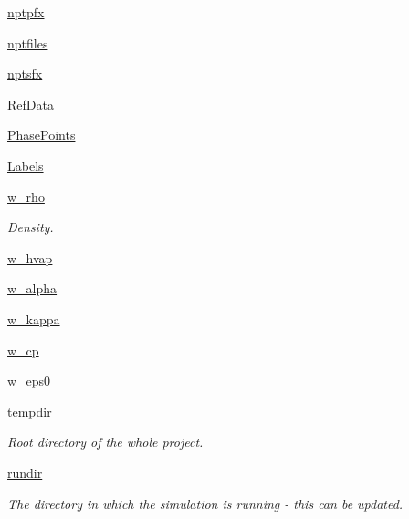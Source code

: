 \begin{DoxyCompactItemize}
\hyperlink{classforcebalance_1_1liquid_1_1Liquid_a0560795c55fc1b5d7668951c77ad97ab}{nptpfx}
\item 
\hyperlink{classforcebalance_1_1liquid_1_1Liquid_a2030a7e21fcce59155a0258daed4f2f7}{nptfiles}
\item 
\hyperlink{classforcebalance_1_1liquid_1_1Liquid_a4125a209929444b7cbfbd60b466dc763}{nptsfx}
\item 
\hyperlink{classforcebalance_1_1liquid_1_1Liquid_a472f32bbaf18b8ead19b9156f305b8fc}{Ref\-Data}
\item 
\hyperlink{classforcebalance_1_1liquid_1_1Liquid_a2c10490d9073a069bd19361f386422ef}{Phase\-Points}
\item 
\hyperlink{classforcebalance_1_1liquid_1_1Liquid_a50f976d2d3d6a1c261756035a26390e2}{Labels}
\item 
\hyperlink{classforcebalance_1_1liquid_1_1Liquid_aef8ad1dda086bde6f48130d273af9784}{w\-\_\-rho}
\begin{DoxyCompactList}\small\item\em Density. \end{DoxyCompactList}\item 
\hyperlink{classforcebalance_1_1liquid_1_1Liquid_abe985fe3aaa03d9f3a1b0a90f26b774d}{w\-\_\-hvap}
\item 
\hyperlink{classforcebalance_1_1liquid_1_1Liquid_a0d36d27d8c406b53bbb1096fbb76adbb}{w\-\_\-alpha}
\item 
\hyperlink{classforcebalance_1_1liquid_1_1Liquid_a6b262d9343247a902063bf62d5f19108}{w\-\_\-kappa}
\item 
\hyperlink{classforcebalance_1_1liquid_1_1Liquid_a3809c649d95ac6c9f662d599e6b1b93d}{w\-\_\-cp}
\item 
\hyperlink{classforcebalance_1_1liquid_1_1Liquid_a75ad3ea94ec845e91499f858e7be5f27}{w\-\_\-eps0}
\item 
\hyperlink{classforcebalance_1_1target_1_1Target_aa1f01b5b78db253b5b66384ed11ed193}{tempdir}
\begin{DoxyCompactList}\small\item\em Root directory of the whole project. \end{DoxyCompactList}\item 
\hyperlink{classforcebalance_1_1target_1_1Target_a6872de5b2d4273b82336ea5b0da29c9e}{rundir}
\begin{DoxyCompactList}\small\item\em The directory in which the simulation is running -\/ this can be updated. \end{DoxyCompactList}\item 

\end{DoxyCompactItemize}
